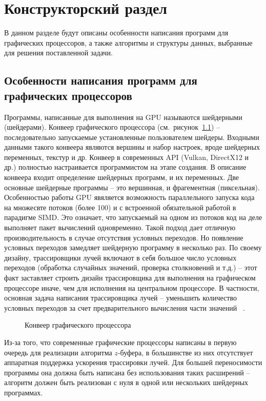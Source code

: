 \chapter{Конструкторский раздел}

В данном разделе будут описаны особенности написания программ для
графических процессоров, а также алгоритмы и структуры данных,
выбранные для решения поставленной задачи.

\section{Особенности написания программ для графических процессоров}

Программы, написанные для выполнения на GPU называются шейдерными (шейдерами).
Конвеер графического процессора (см.~рисунок~\ref{img:pipeline}) -- 
последовательно запускаемые установленные пользователем 
шейдеры. Входными данными такого конвеера являются вершины и набор
настроек, вроде шейдерных переменных, текстур и др.
Конвеер в современных API (Vulkan, DirectX12 и др.) полностью настраивается 
программистом на этапе создания. В описание конвеера входит определение
шейдерных программ, и их переменных. Две основные шейдерные
программы -- это вершинная, и фрагементная (пиксельная). 
Особенностью работы GPU явяляется возможность параллельного запуска 
кода на множесвте потоков (более 100) и с встроенной обязательной работой 
в парадигме SIMD. Это означает, что запускаемый на одном из потоков код
на деле выполняет пакет вычислений одновременно. Такой подход дает 
отличную производительность в случае отсутствия условных переходов. Но 
появление условных переходов замедляет шейдерную программу в несколько раз.
По своему дизайну, трассировщики лучей включают в себя большое число условных
переходов (обработка случайных значений, проверка столкновений и т.д.) -- 
этот факт заставляет строить дизайн трассировщика для выполнения на графическом
процессоре иначе, чем для исполнения на центральном процессоре. В частности,
основная задача написания трассировщика лучей -- уменьшить количество 
условных переходов за счет предварительного вычисления части значений
~\cite{Vulkan}.

\begin{figure}[!ht]
  \centering
  
  \caption{Конвеер графического процессора}
  \label{img:pipeline}
\end{figure}

Из-за того, что современные графические процессоры написаны в первую очередь
для реализации алгоритма $z$-буфера, в большинстве из них
отсутствует аппаратная поддержка ускорения трассировки лучей. Для большей переносимости программы она должна быть написана без использования таких расширений -- алгоритм 
должен быть реализован с нуля в одной или нескольких шейдерных программах.

